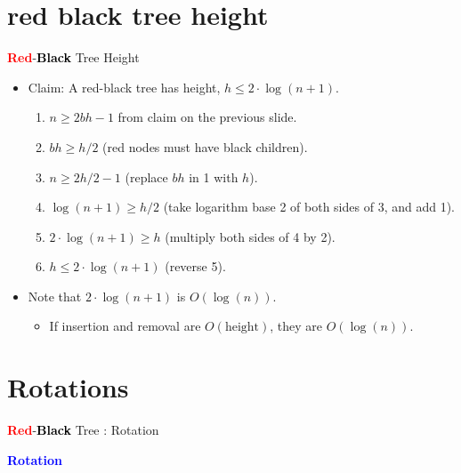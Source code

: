 \documentclass{beamer}
\begin{document}
\section*{red black tree height}
\begin{frame}{\textcolor{red} {\textbf{Red}}-\textcolor{black}{\textbf{Black}} Tree Height}

\begin{itemize}
    \item Claim: A red-black tree has height, \( h \leq 2 \cdot \log(n+1) \).
    \begin{enumerate}
        \item \( n \geq 2bh - 1 \) from claim on the previous slide.
        \item \( bh \geq h/2 \) (red nodes must have black children).
        \item \( n \geq 2h/2 - 1 \) (replace \( bh \) in 1 with \( h \)).
        \item \( \log(n+1) \geq h/2 \) (take logarithm base 2 of both sides of 3, and add 1).
        \item \( 2 \cdot \log(n+1) \geq h \) (multiply both sides of 4 by 2).
        \item \( h \leq 2 \cdot \log(n+1) \) (reverse 5).
    \end{enumerate}
    \item Note that \( 2 \cdot \log(n+1) \) is \( O(\log(n)) \).
    \begin{itemize}
        \item If insertion and removal are \( O(\text{height}) \), they are \( O(\log(n)) \).
    \end{itemize}
\end{itemize}
    
\end{frame}

\section{Rotations}
\begin{frame}{\textcolor{red} {\textbf{Red}}-\textcolor{black}{\textbf{Black}} Tree : Rotation}
    \begin{center}
        {\Huge\textbf{\textcolor{blue}{Rotation}}}
    \end{center}
\end{frame}
\end{document}
